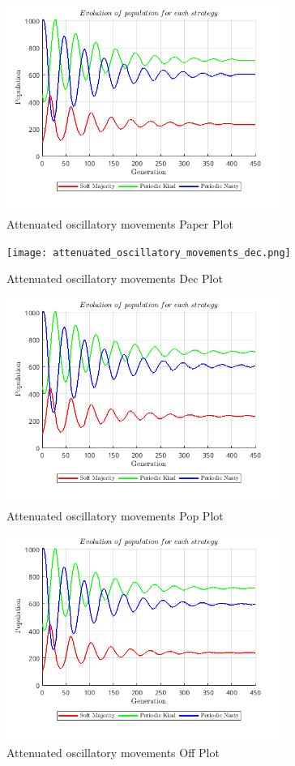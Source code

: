 \documentclass[12pt]{report}
\begin{document}
\begin{figure}[H]
    \centering
    \includegraphics[width=0.8\textwidth]{attenuated_oscillatory_movements_paper.png}
    \caption{Attenuated oscillatory movements Paper Plot}
\end{figure}
\begin{figure}[H]
    \centering
    \texttt{[image: attenuated\_oscillatory\_movements\_dec.png]}
    \caption{Attenuated oscillatory movements Dec Plot}
\end{figure}
\begin{figure}[H]
    \centering
    \includegraphics[width=0.8\textwidth]{attenuated_oscillatory_movements_pop.png}
    \caption{Attenuated oscillatory movements Pop Plot}
\end{figure}
\begin{figure}[H]
    \centering
    \includegraphics[width=0.8\textwidth]{attenuated_oscillatory_movements_off.png}
    \caption{Attenuated oscillatory movements Off Plot}
\end{figure}
\end{document}
